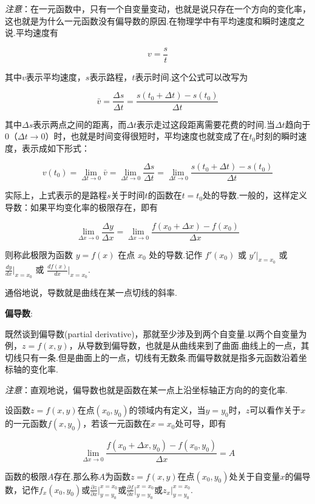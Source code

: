 \emph{注意}：在一元函数中，只有一个自变量变动，也就是说只存在一个方向的变化率，这也就是为什么一元函数没有偏导数的原因.在物理学中有平均速度和瞬时速度之说.平均速度有

\[
v=\frac{s}{t}
\]

其中\(v\)表示平均速度，\(s\)表示路程，\(t\)表示时间.这个公式可以改写为

\[
\bar{v}=\frac{\Delta s}{\Delta t}=\frac{s(t_0+\Delta t)-s(t_0)}{\Delta t}
\]

其中\(\Delta s\)表示两点之间的距离，而\(\Delta t\)表示走过这段距离需要花费的时间.当\(\Delta t\)趋向于0（\(\Delta t \to 0\)）时，也就是时间变得很短时，平均速度也就变成了在\(t_0\)时刻的瞬时速度，表示成如下形式：

\[
v(t_0)=\lim_{\Delta t \to 0}{\bar{v}}=\lim_{\Delta t \to 0}{\frac{\Delta s}{\Delta t}}=\lim_{\Delta t \to 0}{\frac{s(t_0+\Delta t)-s(t_0)}{\Delta t}}
\]

实际上，上式表示的是路程\(s\)关于时间\(t\)的函数在\(t=t_0\)处的导数.一般的，这样定义导数：如果平均变化率的极限存在，即有

\[
\lim_{\Delta x \to 0}{\frac{\Delta y}{\Delta x}}=\lim_{\Delta x \to 0}{\frac{f(x_0+\Delta x)-f(x_0)}{\Delta x}}
\]

则称此极限为函数 \(y=f(x)\) 在点 \(x_0\) 处的导数.记作 \(f'(x_0)\) 或
\(y'\vert_{x=x_0}\) 或 \(\frac{dy}{dx}\vert_{x=x_0}\) 或
\(\frac{df(x)}{dx}\vert_{x=x_0}\).

通俗地说，导数就是曲线在某一点切线的斜率.

\textbf{偏导数}:

既然谈到偏导数(partial
derivative)，那就至少涉及到两个自变量.以两个自变量为例，\(z=f(x,y)​\)，从导数到偏导数，也就是从曲线来到了曲面.曲线上的一点，其切线只有一条.但是曲面上的一点，切线有无数条.而偏导数就是指多元函数沿着坐标轴的变化率.

\emph{注意}：直观地说，偏导数也就是函数在某一点上沿坐标轴正方向的的变化率.

设函数\(z=f(x,y)​\)在点\((x_0,y_0)​\)的领域内有定义，当\(y=y_0​\)时，\(z​\)可以看作关于\(x​\)的一元函数\(f(x,y_0)​\)，若该一元函数在\(x=x_0​\)处可导，即有

\[
\lim_{\Delta x \to 0}{\frac{f(x_0+\Delta x,y_0)-f(x_0,y_0)}{\Delta x}}=A
\]

函数的极限\(A\)存在.那么称\(A\)为函数\(z=f(x,y)\)在点\((x_0,y_0)\)处关于自变量\(x\)的偏导数，记作\(f_x(x_0,y_0)\)或\(\frac{\partial z}{\partial x}\vert_{y=y_0}^{x=x_0}\)或\(\frac{\partial f}{\partial x}\vert_{y=y_0}^{x=x_0}\)或\(z_x\vert_{y=y_0}^{x=x_0}\).

